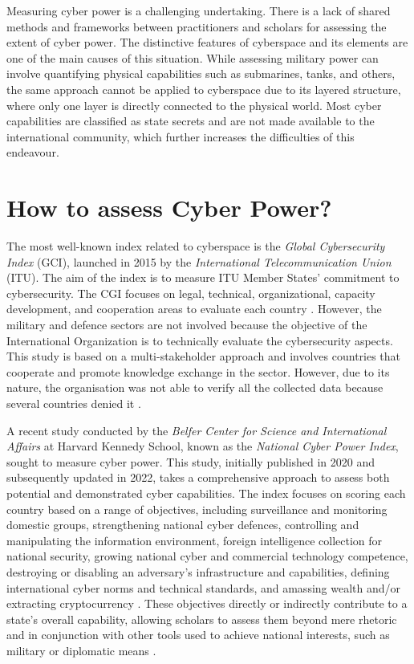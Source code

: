 Measuring cyber power is a challenging undertaking. There is a lack of shared methods and frameworks between practitioners and scholars for assessing the extent of cyber power. The distinctive features of cyberspace and its elements are one of the main causes of this situation. While assessing military power can involve quantifying physical capabilities such as submarines, tanks, and others, the same approach cannot be applied to cyberspace due to its layered structure, where only one layer is directly connected to the physical world. Most cyber capabilities are classified as state secrets and are not made available to the international community, which further increases the difficulties of this endeavour.

\section{How to assess Cyber Power?}

The most well-known index related to cyberspace is the \textit{Global Cybersecurity Index} (GCI), launched in 2015 by the \textit{International Telecommunication Union} (ITU). The aim of the index is to measure ITU Member States’ commitment to cybersecurity. The CGI focuses on legal, technical, organizational, capacity development, and cooperation areas to evaluate each country \autocite{internationaltelecommunicationunion_2020_global}. However, the military and defence sectors are not involved because the objective of the International Organization is to technically evaluate the cybersecurity aspects. This study is based on a multi-stakeholder approach and involves countries that cooperate and promote knowledge exchange in the sector. However, due to its nature, the organisation was not able to verify all the collected data because several countries denied it \autocite[viii]{internationaltelecommunicationunion_2020_global}. 

A recent study conducted by the \textit{Belfer Center for Science and International Affairs} at Harvard Kennedy School, known as the \textit{National Cyber Power Index}, sought to measure cyber power. This study, initially published in 2020 and subsequently updated in 2022, takes a comprehensive approach to assess both potential and demonstrated cyber capabilities. The index focuses on scoring each country based on a range of objectives, including surveillance and monitoring domestic groups, strengthening national cyber defences, controlling and manipulating the information environment, foreign intelligence collection for national security, growing national cyber and commercial technology competence, destroying or disabling an adversary's infrastructure and capabilities, defining international cyber norms and technical standards, and amassing wealth and/or extracting cryptocurrency \autocite[5-6]{voo_2022_national}. These objectives directly or indirectly contribute to a state's overall capability, allowing scholars to assess them beyond mere rhetoric and in conjunction with other tools used to achieve national interests, such as military or diplomatic means \autocite{voo_2022_national}.  


